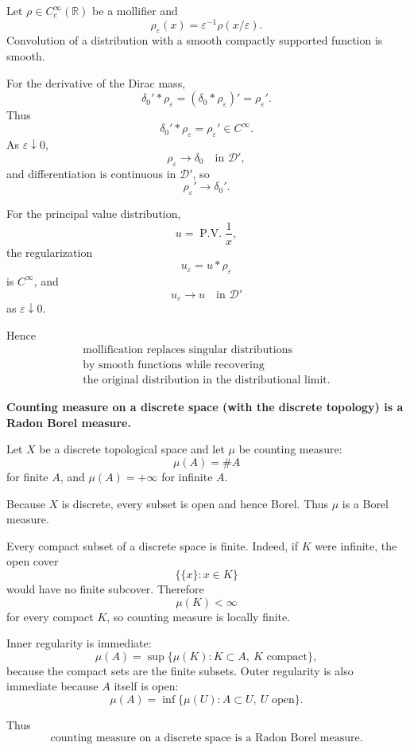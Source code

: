 \begin{solution}
Let \(\rho\in C_c^\infty(\mathbb R)\) be a mollifier and
\[
\rho_\varepsilon(x)
=
\varepsilon^{-1}\rho(x/\varepsilon).
\]
Convolution of a distribution with a smooth compactly supported function is smooth.

For the derivative of the Dirac mass,
\[
\delta_0'*\rho_\varepsilon
=
(\delta_0*\rho_\varepsilon)'
=
\rho_\varepsilon'.
\]
Thus
\[
\boxed{
\delta_0'*\rho_\varepsilon=\rho_\varepsilon'
\in C^\infty.
}
\]
As \(\varepsilon\downarrow0\),
\[
\rho_\varepsilon\to\delta_0
\quad\text{in }\mathcal D',
\]
and differentiation is continuous in \(\mathcal D'\), so
\[
\rho_\varepsilon'
\to
\delta_0'.
\]

For the principal value distribution,
\[
u=\operatorname{P.V.}\frac1x,
\]
the regularization
\[
u_\varepsilon
=
u*\rho_\varepsilon
\]
is \(C^\infty\), and
\[
u_\varepsilon\to u
\quad\text{in }\mathcal D'
\]
as \(\varepsilon\downarrow0\).

Hence
\[
\boxed{\begin{gathered}
\text{mollification replaces singular distributions}
\\
\text{by smooth functions while recovering}
\\
\text{the original distribution in the distributional limit.}
\end{gathered}}
\]
\end{solution}


\begin{problem}[CP-II-0199]
\label{prob:cp-ii-0199}
\textbf{Counting measure on a discrete space (with the discrete topology) is a Radon Borel measure.}

\end{problem}

\begin{solution}
Let \(X\) be a discrete topological space and let \(\mu\) be counting measure:
\[
\mu(A)=\#A
\]
for finite \(A\), and \(\mu(A)=+\infty\) for infinite \(A\).

Because \(X\) is discrete, every subset is open and hence Borel. Thus \(\mu\) is a Borel
measure.

Every compact subset of a discrete space is finite. Indeed, if \(K\) were infinite, the open
cover
\[
\{\{x\}:x\in K\}
\]
would have no finite subcover. Therefore
\[
\mu(K)<\infty
\]
for every compact \(K\), so counting measure is locally finite.

Inner regularity is immediate:
\[
\mu(A)
=
\sup\{\mu(K):K\subset A,\ K\text{ compact}\},
\]
because the compact sets are the finite subsets. Outer regularity is also immediate because
\(A\) itself is open:
\[
\mu(A)
=
\inf\{\mu(U):A\subset U,\ U\text{ open}\}.
\]

Thus
\[
\boxed{
\text{counting measure on a discrete space is a Radon Borel measure}.
}
\]
\end{solution}


